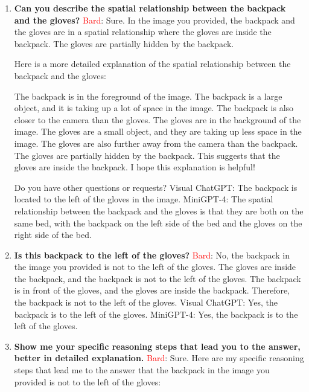\begin{enumerate}
    \item \textbf{Can you describe the spatial relationship between the backpack and the gloves?}
    \subitem \textcolor{Red}{Bard}: Sure. In the image you provided, the backpack and the gloves are in a spatial relationship where the gloves are inside the backpack. The gloves are partially hidden by the backpack.

    Here is a more detailed explanation of the spatial relationship between the backpack and the gloves:
    
    The backpack is in the foreground of the image. The backpack is a large object, and it is taking up a lot of space in the image. The backpack is also closer to the camera than the gloves.
    The gloves are in the background of the image. The gloves are a small object, and they are taking up less space in the image. The gloves are also further away from the camera than the backpack.
    The gloves are partially hidden by the backpack. This suggests that the gloves are inside the backpack.
    I hope this explanation is helpful!
    
    Do you have other questions or requests?
    \subitem Visual ChatGPT: The backpack is located to the left of the gloves in the image.
    \subitem MiniGPT-4: The spatial relationship between the backpack and the gloves is that they are both on the same bed, with the backpack on the left side of the bed and the gloves on the right side of the bed.
    \item \textbf{Is this backpack to the left of the gloves?}
    \subitem \textcolor{Red}{Bard}: 
    No, the backpack in the image you provided is not to the left of the gloves. The gloves are inside the backpack, and the backpack is not to the left of the gloves. The backpack is in front of the gloves, and the gloves are inside the backpack. Therefore, the backpack is not to the left of the gloves.
    \subitem Visual ChatGPT: Yes, the backpack is to the left of the gloves.
    \subitem MiniGPT-4: Yes, the backpack is to the left of the gloves.
    \item \textbf{Show me your specific reasoning steps that lead you to the answer, better in detailed explanation.}
    \subitem \textcolor{Red}{Bard}: 
    Sure. Here are my specific reasoning steps that lead me to the answer that the backpack in the image you provided is not to the left of the gloves:


\end{enumerate}
